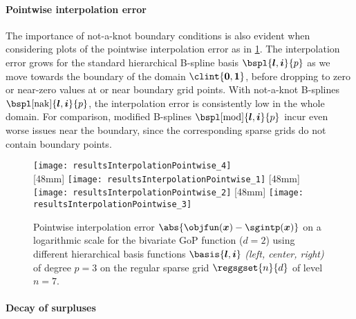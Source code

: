 \paragraph{Pointwise interpolation error}

The importance of not-a-knot boundary conditions is also evident
when considering plots of the pointwise interpolation error as in
\cref{fig:resultsInterpolationErrorPointwise}.
The interpolation error grows for the standard hierarchical
B-spline basis $\bspl{\*l,\*i}{p}$
as we move towards the boundary of the domain $\clint{\*0, \*1}$,
before dropping to zero or near-zero values at or near boundary grid points.
With not-a-knot B-splines $\bspl[\nak]{\*l,\*i}{p}$,
the interpolation error is consistently low in the whole domain.
For comparison, modified B-splines $\bspl[\modified]{\*l,\*i}{p}$
incur even worse issues near the boundary, since the corresponding sparse grids
do not contain boundary points.

\begin{figure}
  \texttt{[image: resultsInterpolationPointwise\_4]}\\[2mm]%
  [48mm]{%
    \texttt{[image: resultsInterpolationPointwise\_1]}%
  }%
  \hfill%
  [48mm]{%
    \texttt{[image: resultsInterpolationPointwise\_2]}%
  }%
  \hfill%
  [48mm]{%
    \texttt{[image: resultsInterpolationPointwise\_3]}%
  }%
  \caption[Pointwise interpolation error]{%
    Pointwise interpolation error
    $\abs{\objfun(\*x) - \sgintp(\*x)}$ on a logarithmic scale
    for the bivariate GoP function ($d = 2$)
    using different hierarchical basis functions
    $\basis{\*l,\*i}$ \emph{(left, center, right)} of degree $p = 3$ on
    the regular sparse grid $\regsgset{n}{d}$ of level $n = 7$.%
  }%
  \label{fig:resultsInterpolationErrorPointwise}%
\end{figure}

\paragraph{Decay of surpluses}

